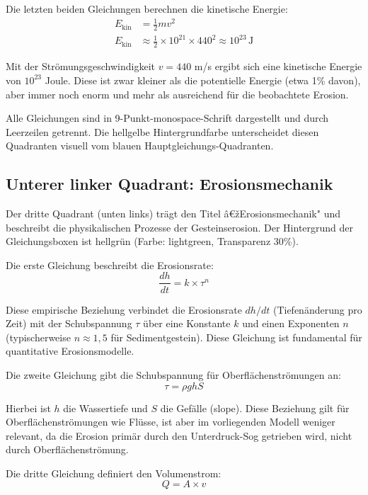 ﻿\documentclass[12pt,a4paper]{report}
\begin{document}
Die letzten beiden Gleichungen berechnen die kinetische Energie:
\begin{align*}
	E_{\mathrm{kin}} &= \frac{1}{2} m v^2 \\
	E_{\mathrm{kin}} &\approx \frac{1}{2} \times 10^{21} \times 440^2 \approx 10^{23} \, \mathrm{J}
\end{align*}

Mit der Strömungsgeschwindigkeit $v = 440$ m/s ergibt sich eine kinetische Energie von $10^{23}$ Joule. Diese ist zwar kleiner als die potentielle Energie (etwa 1\% davon), aber immer noch enorm und mehr als ausreichend für die beobachtete Erosion.

Alle Gleichungen sind in 9-Punkt-monospace-Schrift dargestellt und durch Leerzeilen getrennt. Die hellgelbe Hintergrundfarbe unterscheidet diesen Quadranten visuell vom blauen Hauptgleichungs-Quadranten.

\subsection{Unterer linker Quadrant: Erosionsmechanik}

Der dritte Quadrant (unten links) trägt den Titel â€žErosionsmechanik" und beschreibt die physikalischen Prozesse der Gesteinserosion. Der Hintergrund der Gleichungsboxen ist hellgrün (Farbe: lightgreen, Transparenz 30\%).

Die erste Gleichung beschreibt die Erosionsrate:
\begin{equation*}
	\frac{dh}{dt} = k \times \tau^n
\end{equation*}

Diese empirische Beziehung verbindet die Erosionsrate $dh/dt$ (Tiefenänderung pro Zeit) mit der Schubspannung $\tau$ über eine Konstante $k$ und einen Exponenten $n$ (typischerweise $n \approx 1{,}5$ für Sedimentgestein). Diese Gleichung ist fundamental für quantitative Erosionsmodelle.

Die zweite Gleichung gibt die Schubspannung für Oberflächenströmungen an:
\begin{equation*}
	\tau = \rho g h S
\end{equation*}

Hierbei ist $h$ die Wassertiefe und $S$ die Gefälle (slope). Diese Beziehung gilt für Oberflächenströmungen wie Flüsse, ist aber im vorliegenden Modell weniger relevant, da die Erosion primär durch den Unterdruck-Sog getrieben wird, nicht durch Oberflächenströmung.

Die dritte Gleichung definiert den Volumenstrom:
\begin{equation*}
	Q = A \times v
\end{equation*}
\end{document}
